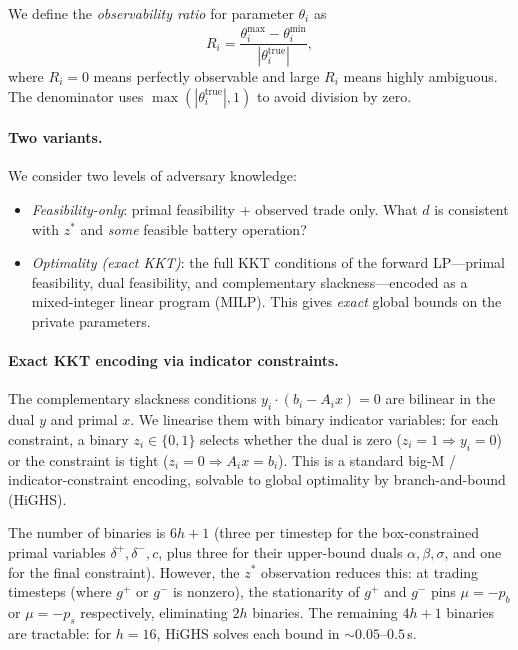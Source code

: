 \documentclass[11pt,a4paper]{article}
\newcommand{\netload}{d}
\newcommand{\ratio}[1]{R_{#1}}
\begin{document}
We define the \emph{observability ratio} for parameter $\theta_i$ as
\begin{equation}\label{eq:ratio}
    \ratio{i} = \frac{\theta_i^{\max} - \theta_i^{\min}}{|\theta_i^{\text{true}}|},
\end{equation}
where $\ratio{i} = 0$ means perfectly observable and large $\ratio{i}$ means highly ambiguous. The denominator uses $\max(|\theta_i^{\text{true}}|, 1)$ to avoid division by zero.

\paragraph{Two variants.}
We consider two levels of adversary knowledge:
\begin{itemize}[nosep]
    \item \emph{Feasibility-only}: primal feasibility + observed trade only. What $\netload$ is consistent with $z^*$ and \emph{some} feasible battery operation?
    \item \emph{Optimality (exact KKT)}: the full KKT conditions of the forward LP---primal feasibility, dual feasibility, and complementary slackness---encoded as a mixed-integer linear program (MILP). This gives \emph{exact} global bounds on the private parameters.
\end{itemize}

\paragraph{Exact KKT encoding via indicator constraints.}
The complementary slackness conditions $y_i \cdot (b_i - A_i x) = 0$ are bilinear in the dual $y$ and primal $x$. We linearise them with binary indicator variables: for each constraint, a binary $z_i \in \{0,1\}$ selects whether the dual is zero ($z_i = 1 \Rightarrow y_i = 0$) or the constraint is tight ($z_i = 0 \Rightarrow A_i x = b_i$). This is a standard big-M / indicator-constraint encoding, solvable to global optimality by branch-and-bound (HiGHS).

The number of binaries is $6h + 1$ (three per timestep for the box-constrained primal variables $\delta^+, \delta^-, c$, plus three for their upper-bound duals $\alpha, \beta, \sigma$, and one for the final constraint). However, the $z^*$ observation reduces this: at trading timesteps (where $g^+$ or $g^-$ is nonzero), the stationarity of $g^+$ and $g^-$ pins $\mu = -p_b$ or $\mu = -p_s$ respectively, eliminating $2h$ binaries. The remaining $4h + 1$ binaries are tractable: for $h = 16$, HiGHS solves each bound in $\sim 0.05$--$0.5$\,s.
\end{document}
